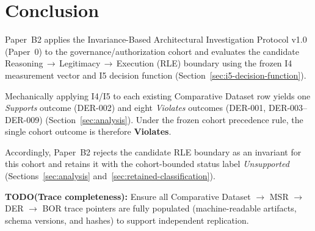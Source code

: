 \section{Conclusion}
Paper~B2 applies the Invariance-Based Architectural Investigation Protocol v1.0 (Paper~0) to the governance/authorization cohort and evaluates the candidate Reasoning\,$\rightarrow$\,Legitimacy\,$\rightarrow$\,Execution (RLE) boundary using the frozen I4 measurement vector and I5 decision function (Section~\ref{sec:i5-decision-function}).

Mechanically applying I4/I5 to each existing Comparative Dataset row yields one \emph{Supports} outcome (DER-002) and eight \emph{Violates} outcomes (DER-001, DER-003--DER-009) (Section~\ref{sec:analysis}). Under the frozen cohort precedence rule, the single cohort outcome is therefore \textbf{Violates}.

Accordingly, Paper~B2 rejects the candidate RLE boundary as an invariant for this cohort and retains it with the cohort-bounded status label \emph{Unsupported} (Sections~\ref{sec:analysis} and~\ref{sec:retained-classification}).

\textbf{TODO(Trace completeness):} Ensure all Comparative Dataset $\rightarrow$ MSR $\rightarrow$ DER $\rightarrow$ BOR trace pointers are fully populated (machine-readable artifacts, schema versions, and hashes) to support independent replication.
